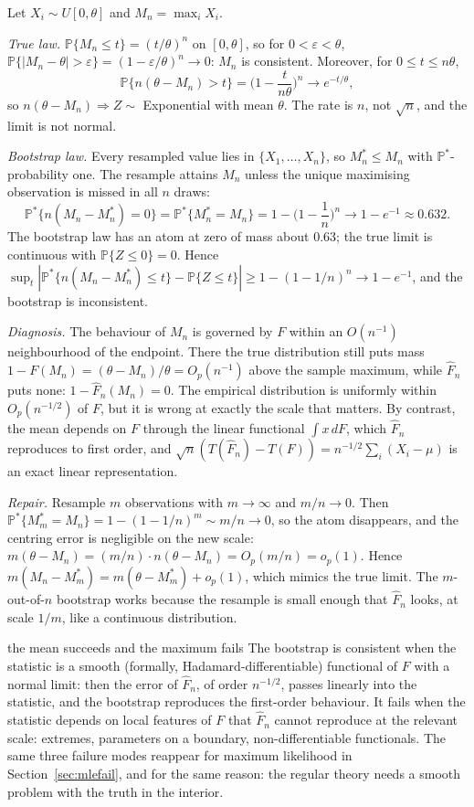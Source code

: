 \documentclass[11pt,a4paper]{article}
\renewcommand{\P}{\mathbb{P}}
\newcommand{\cd}{\Rightarrow}
\newcommand{\op}{o_p}
\newcommand{\Op}{O_p}
\newcommand{\Fn}{\widehat F_n}
\newcommand{\Pstar}{\P^{*}}
\begin{document}
\begin{example}\label{ex:bootmax}
Let $X_i\sim U[0,\theta]$ and $M_n=\max_iX_i$.

\emph{True law.} $\P\{M_n\le t\}=(t/\theta)^n$ on $[0,\theta]$, so for $0<\varepsilon<\theta$, $\P\{|M_n-\theta|>\varepsilon\}=(1-\varepsilon/\theta)^n\to0$: $M_n$ is consistent. Moreover, for $0\le t\le n\theta$,
\[
\P\{n(\theta-M_n)>t\}=\Big(1-\frac{t}{n\theta}\Big)^n\to e^{-t/\theta},
\]
so $n(\theta-M_n)\cd Z\sim$ Exponential with mean $\theta$. The rate is $n$, not $\sqrt n$, and the limit is not normal.

\emph{Bootstrap law.} Every resampled value lies in $\{X_1,\ldots,X_n\}$, so $M_n^*\le M_n$ with $\Pstar$-probability one. The resample attains $M_n$ unless the unique maximising observation is missed in all $n$ draws:
\[
\Pstar\{n(M_n-M_n^*)=0\}=\Pstar\{M_n^*=M_n\}=1-\Big(1-\frac1n\Big)^n\to1-e^{-1}\approx0.632 .
\]
The bootstrap law has an atom at zero of mass about $0.63$; the true limit is continuous with $\P\{Z\le0\}=0$. Hence $\sup_t|\Pstar\{n(M_n-M_n^*)\le t\}-\P\{Z\le t\}|\ge1-(1-1/n)^n\to1-e^{-1}$, and the bootstrap is inconsistent.

\emph{Diagnosis.} The behaviour of $M_n$ is governed by $F$ within an $O(n^{-1})$ neighbourhood of the endpoint. There the true distribution still puts mass $1-F(M_n)=(\theta-M_n)/\theta=\Op(n^{-1})$ above the sample maximum, while $\Fn$ puts none: $1-\Fn(M_n)=0$. The empirical distribution is uniformly within $\Op(n^{-1/2})$ of $F$, but it is wrong at exactly the scale that matters. By contrast, the mean depends on $F$ through the linear functional $\int x\,dF$, which $\Fn$ reproduces to first order, and $\sqrt n(T(\Fn)-T(F))=n^{-1/2}\sum_i(X_i-\mu)$ is an exact linear representation.

\emph{Repair.} Resample $m$ observations with $m\to\infty$ and $m/n\to0$. Then $\Pstar\{M_m^*=M_n\}=1-(1-1/n)^m\sim m/n\to0$, so the atom disappears, and the centring error is negligible on the new scale: $m(\theta-M_n)=(m/n)\cdot n(\theta-M_n)=\Op(m/n)=\op(1)$. Hence $m(M_n-M_m^*)=m(\theta-M_m^*)+\op(1)$, which mimics the true limit. The $m$-out-of-$n$ bootstrap works because the resample is small enough that $\Fn$ looks, at scale $1/m$, like a continuous distribution.
\end{example}

\begin{whybox}{the mean succeeds and the maximum fails}
The bootstrap is consistent when the statistic is a smooth (formally, Hadamard-differentiable) functional of $F$ with a normal limit: then the error of $\Fn$, of order $n^{-1/2}$, passes linearly into the statistic, and the bootstrap reproduces the first-order behaviour. It fails when the statistic depends on local features of $F$ that $\Fn$ cannot reproduce at the relevant scale: extremes, parameters on a boundary, non-differentiable functionals. The same three failure modes reappear for maximum likelihood in Section~\ref{sec:mlefail}, and for the same reason: the regular theory needs a smooth problem with the truth in the interior.
\end{whybox}
\end{document}

